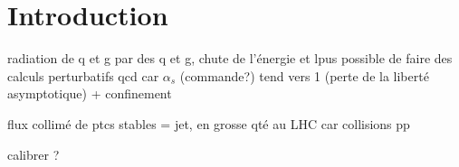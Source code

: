 \section{Introduction}

radiation de q et g par des q et g, chute de l'énergie et lpus possible de faire des calculs perturbatifs qcd car $\alpha_s$ (commande?) tend vers 1 (perte de la liberté asymptotique) + confinement

flux collimé de ptcs stables = jet, en grosse qté au LHC car collisions pp

calibrer ?

